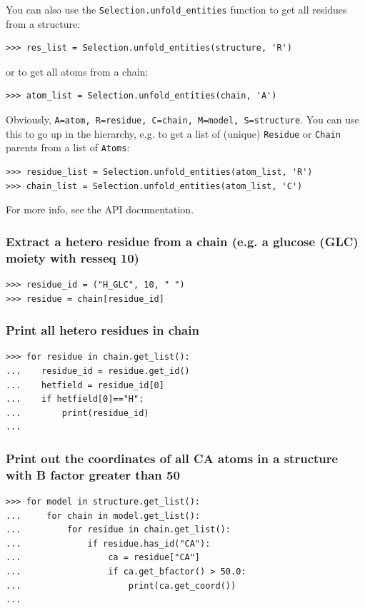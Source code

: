 \documentclass{report}
\begin{document}
You can also use the \verb+Selection.unfold_entities+ function to get all residues from a structure:
\begin{verbatim}
>>> res_list = Selection.unfold_entities(structure, 'R')
\end{verbatim}
or to get all atoms from a chain:
\begin{verbatim}
>>> atom_list = Selection.unfold_entities(chain, 'A')
\end{verbatim}
Obviously, \verb+A=atom, R=residue, C=chain, M=model, S=structure+.
You can use this to go up in the hierarchy, e.g. to get a list of
(unique) \verb+Residue+ or \verb+Chain+ parents from a list of
\verb+Atoms+:

\begin{verbatim}
>>> residue_list = Selection.unfold_entities(atom_list, 'R')
>>> chain_list = Selection.unfold_entities(atom_list, 'C')
\end{verbatim}
For more info, see the API documentation.

\subsubsection*{Extract a hetero residue from a chain (e.g. a glucose (GLC) moiety with resseq 10)}

\begin{verbatim}
>>> residue_id = ("H_GLC", 10, " ")
>>> residue = chain[residue_id]
\end{verbatim}

\subsubsection*{Print all hetero residues in chain}

\begin{verbatim}
>>> for residue in chain.get_list():
...    residue_id = residue.get_id()
...    hetfield = residue_id[0]
...    if hetfield[0]=="H":
...        print(residue_id)
...
\end{verbatim}

\subsubsection*{Print out the coordinates of all CA atoms in a structure with B factor greater than 50}

\begin{verbatim}
>>> for model in structure.get_list():
...     for chain in model.get_list():
...         for residue in chain.get_list():
...             if residue.has_id("CA"):
...                 ca = residue["CA"]
...                 if ca.get_bfactor() > 50.0:
...                     print(ca.get_coord())
...
\end{verbatim}
\end{document}
